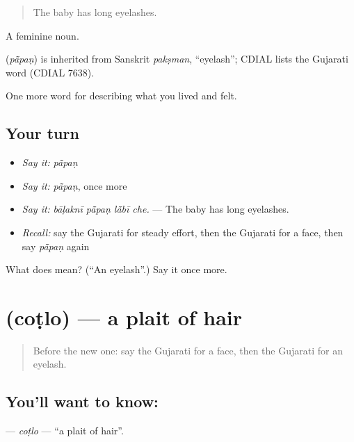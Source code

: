 \begin{quote}
The baby has long eyelashes.
\end{quote}

A feminine noun.

\begin{cousinweb}
\textbf{} (\emph{pā̃paṇ}) is inherited from Sanskrit \emph{pakṣman}, \textquotedblleft{}eyelash\textquotedblright{}; CDIAL lists the Gujarati word (CDIAL 7638).
\end{cousinweb}

\begin{grammarlens}[title={What you've built}]
One more word for describing what you lived and felt.
\end{grammarlens}

\subsection*{Your turn}
\begin{itemize}
\raggedright
  \item \emph{Say it:} \emph{pā̃paṇ}
  \item \emph{Say it:} \emph{pā̃paṇ}, once more
  \item \emph{Say it:} \emph{bāḷaknī pā̃paṇ lā̃bī che.} — The baby has long eyelashes.
  \item \emph{Recall:} say the Gujarati for steady effort, then the Gujarati for a face, then say \emph{pā̃paṇ} again
\end{itemize}

\begin{tcolorbox}[breakable,colback=teal!4,colframe=teal!35!black,title={Before you move on}]
What does  mean? (\textquotedblleft{}An eyelash\textquotedblright{}.) Say it once more.
\end{tcolorbox}
\section[\texorpdfstring{\gu{ચોટલો} (coṭlo)}{ચોટલો (coṭlo)}]{ (coṭlo) — a plait of hair}

\label{lesson:GU-C470-cotlo}



\begin{quote}
Before the new one: say the Gujarati for a face, then the Gujarati for an eyelash.
\end{quote}

\subsection*{You'll want to know: }
\textbf{} — \emph{coṭlo} — \textquotedblleft{}a plait of hair\textquotedblright{}.

